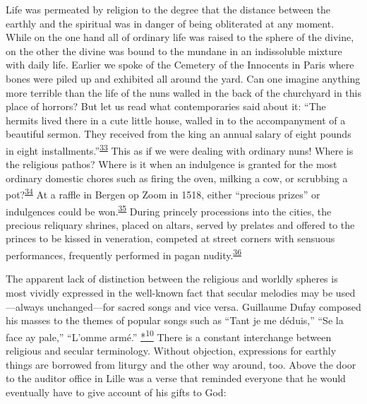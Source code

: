 Life was permeated by religion to the degree that the distance between
the earthly and the spiritual was in danger of being obliterated at any
moment. While on the one hand all of ordinary life was raised to the
sphere of the divine, on the other the divine was bound to the mundane
in an indissoluble mixture with daily life. Earlier we spoke of the
Cemetery of the Innocents in Paris where bones were piled up and
exhibited all around the yard. Can one imagine anything more terrible
than the life of the nuns walled in the back of the churchyard in this
place of horrors? But let us read what contemporaries said about it:
``The hermits lived there in a cute little house, walled in to the
accompanyment of a beautiful sermon. They received from the king an
annual salary of eight pounds in eight
installments.''\textsuperscript{\protect\hypertarget{13_Chapter_Six__THE_DEPICTION_OF_TH.xhtmlux5cux23id_1205}{\protect\hyperlink{23_NOTES.xhtmlux5cux23id_1206}{33}}}
This as if we were dealing with ordinary nuns! Where is the religious
pathos? Where is it when an
\protect\hypertarget{13_Chapter_Six__THE_DEPICTION_OF_TH.xhtmlux5cux23page_180}{}{}indulgence
is granted for the most ordinary domestic chores such as firing the
oven, milking a cow, or scrubbing a
pot?\textsuperscript{\protect\hypertarget{13_Chapter_Six__THE_DEPICTION_OF_TH.xhtmlux5cux23id_1203}{\protect\hyperlink{23_NOTES.xhtmlux5cux23id_1204}{34}}}
At a raffle in Bergen op Zoom in 1518, either ``precious prizes'' or
indulgences could be
won.\textsuperscript{\protect\hypertarget{13_Chapter_Six__THE_DEPICTION_OF_TH.xhtmlux5cux23id_1201}{\protect\hyperlink{23_NOTES.xhtmlux5cux23id_1202}{35}}}
During princely processions into the cities, the precious reliquary
shrines, placed on altars, served by prelates and offered to the princes
to be kissed in veneration, competed at street corners with sensuous
performances, frequently performed in pagan
nudity.\textsuperscript{\protect\hypertarget{13_Chapter_Six__THE_DEPICTION_OF_TH.xhtmlux5cux23id_1199}{\protect\hyperlink{23_NOTES.xhtmlux5cux23id_1200}{36}}}

The apparent lack of distinction between the religious and worldly
spheres is most vividly expressed in the well-known fact that secular
melodies may be used---always unchanged---for sacred songs and vice
versa. Guillaume Dufay composed his masses to the themes of popular
songs such as ``Tant je me déduis,'' ``Se la face ay pale,'' ``L'omme
armé.''
\protect\hypertarget{13_Chapter_Six__THE_DEPICTION_OF_TH.xhtmlux5cux23id_3007}{\protect\hyperlink{23_NOTES.xhtmlux5cux23id_3008}{*\textsuperscript{10}}}
There is a constant interchange between religious and secular
terminology. Without objection, expressions for earthly things are
borrowed from liturgy and the other way around, too. Above the door to
the auditor office in Lille was a verse that reminded everyone that he
would eventually have to give account of his gifts to God:

